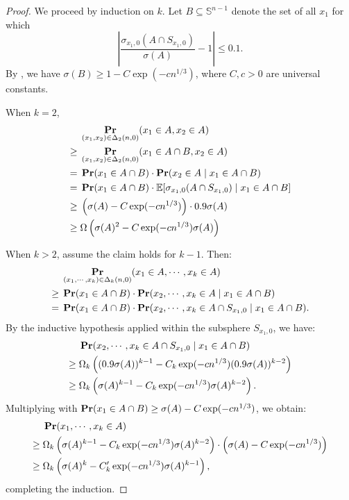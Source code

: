 \documentclass[11pt]{article}
\renewcommand{\Pr}{\mathop{\bf Pr\/}}
\newcommand{\E}{\mathop{\mathbb E\/}}
\newcommand{\sn}{{\mathbb{S}^{n-1} }}
\begin{document}
\begin{proof}
We proceed by induction on \( k \). Let \( B \subseteq \sn \) denote the set of all \( x_1 \) for which
\[
\left| \frac{\sigma_{x_1,0}(A \cap S_{x_1,0})}{\sigma(A)} - 1 \right| \leq 0.1.
\]
By , we have \( \sigma(B) \geq 1 - C \exp(-c n^{1/3}) \), where \( C, c > 0 \) are universal constants.

When $k=2$,
\begin{align*}
&\Pr_{(x_1, x_2) \in \Delta_2(n,0)}(x_1 \in A, x_2 \in A) \\
\geq{} &\Pr_{(x_1, x_2) \in \Delta_2(n,0)}(x_1 \in A \cap B, x_2 \in A) \\
={} &\Pr(x_1 \in A \cap B) \cdot \Pr(x_2 \in A \mid x_1 \in A \cap B) \\
={} &\Pr(x_1 \in A \cap B) \cdot \E[\sigma_{x_1,0}(A \cap S_{x_1,0}) \mid x_1 \in A \cap B] \\
\geq{} &\left(\sigma(A) - C \exp(-c n^{1/3})\right) \cdot 0.9 \sigma(A) \\
\geq{} &\Omega\left(\sigma(A)^2-C \exp(-cn^{1/3})\sigma(A)\right)
\end{align*}

When $k>2$, assume the claim holds for \( k-1 \). Then:
\begin{align*}
&\Pr_{(x_1, \cdots, x_k) \in \Delta_k(n,0)}(x_1 \in A, \cdots, x_k \in A) \\
\geq{} &\Pr(x_1 \in A \cap B) \cdot \Pr(x_2, \cdots, x_k \in A \mid x_1 \in A \cap B) \\
={} &\Pr(x_1 \in A \cap B) \cdot \Pr(x_2, \cdots, x_k \in A \cap S_{x_1,0} \mid x_1 \in A \cap B).
\end{align*}
By the inductive hypothesis applied within the subsphere \( S_{x_1,0} \), we have:
\begin{align*}
&\Pr(x_2, \cdots, x_k \in A \cap S_{x_1,0} \mid x_1 \in A \cap B) \\
\geq{} &\Omega_k\left((0.9\sigma(A))^{k-1}-C_k\exp(-cn^{1/3})(0.9\sigma(A))^{k-2}\right)\\
\geq{} &\Omega_k\left(\sigma(A)^{k-1}-C_k \exp(-cn^{1/3})\sigma(A)^{k-2}\right).
\end{align*}
Multiplying with \( \Pr(x_1 \in A \cap B) \geq \sigma(A) - C \exp(-c n^{1/3}) \), we obtain:
\begin{align*}
&\Pr(x_1, \cdots, x_k \in A) \\
\geq{} &\Omega_k\left(\sigma(A)^{k-1}-C_k\exp(-cn^{1/3})\sigma(A)^{k-2}\right) \cdot \left(\sigma(A) - C \exp(-c n^{1/3})\right) \\
\geq{} & \Omega_k\left(\sigma(A)^k-C'_{k}\exp(-cn^{1/3})\sigma(A)^{k-1}\right),
\end{align*}
completing the induction.
\end{proof}
\end{document}
